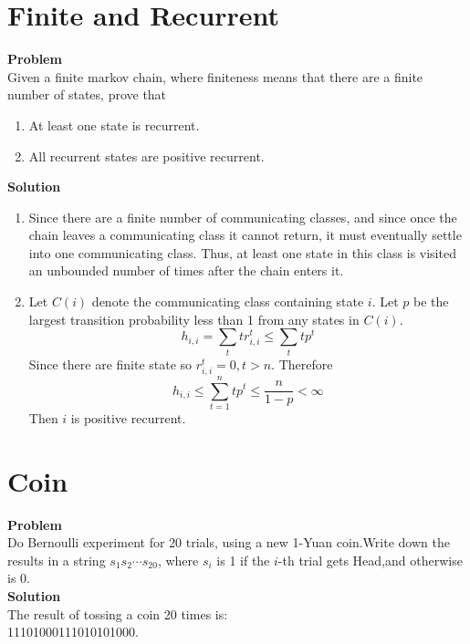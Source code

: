 	\section{Finite and Recurrent}
	\textbf{Problem}\\
	Given a finite markov chain, where finiteness means that there are a finite number of states, prove that
	\begin{enumerate}
		\item At least one state is recurrent.
		\item All recurrent states are positive recurrent.
	\end{enumerate}
	\textbf{Solution}
	\begin{enumerate}
		\item
		Since there are a finite number of communicating classes, and
		since once the chain leaves a communicating class it cannot return, it must
		eventually settle into one communicating class. Thus, at least one state in this
		class is visited an unbounded number of times after the chain enters it.
		\item
		Let $C(i)$ denote the communicating class containing state $i$. Let $p$ be the largest transition probability less than 1 from any states in $C(i)$.
		\begin{equation*}
			h_{i,i} = \sum_t t r_{i,i}^t \le \sum_t t p^t
		\end{equation*}
		Since there are finite state so $r_{i,i}^t = 0, t>n$. Therefore
		\begin{equation*}
			h_{i,i} \le \sum_{t=1}^{n} t p^t \le \frac{n}{1-p} < \infty
		\end{equation*}
		Then $i$ is positive recurrent.
		
	\end{enumerate}
	
	\section{Coin}
	\textbf{Problem}\\
	Do Bernoulli experiment for 20 trials, using a new 1-Yuan coin.Write down the results in a string $s_1 s_2 \cdots s_{20}$, where $s_i$ is 1 if the $i$-th trial gets Head,and otherwise is 0.
	\\
	\textbf{Solution}\\
	The result of tossing a coin 20 times is:\\11101000111010101000.
